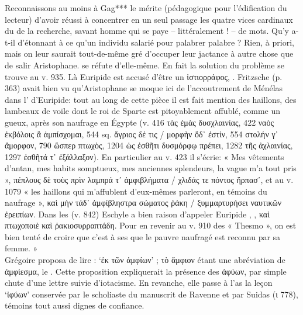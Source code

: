 {{Reconnaissons au moins à Gag*** le mérite (pédagogique pour l'édification du lecteur) d'avoir réussi à concentrer en un seul passage les quatre vices cardinaux du  de la recherche, savant homme qui se paye – littéralement ! – de mots. Qu'y a-t-il d'étonnant à ce qu'un individu salarié pour palabrer palabre ? Rien, à priori, mais on leur saurait tout-de-même gré d'occuper leur jactance à autre chose que de salir Aristophane.} se réfute d'elle-même. En fait la solution du problème se trouve au v. 935. Là Euripide est accusé d'être un ἱστιορράφος, . Fritzsche (p. 363) avait bien vu qu'Aristophane se moque ici de l'accoutrement de Ménélas dans l' d'Euripide: tout au long de cette pièce il est fait mention des haillons, des lambeaux de voile dont le roi de Sparte est pitoyablement affublé, comme un gueux, après son naufrage en Égypte (v. 416 τὰς ἐμὰς δυσχλαινίας, 422 ναὸς ἐκβόλοις ἃ ἀμπίσχομαι, 544 sq. ἄγριος δέ τις / μορφὴν ὅδ᾽ ἐστίν, 554 στολήν γ᾽ ἄμορφον, 790 ὥσπερ πτωχὸς, 1204 ὡς ἐσθῆτι δυσμόρφῳ πρέπει, 1282 τῆς ἀχλαινίας, 1297 ἐσθῆτά τ᾽ ἐξάλλαξον). En particulier au v. 423 il s'écrie: « Mes vêtements d'antan, mes habits somptueux, mes anciennes splendeurs, la vague m'a tout pris », πέπλους δὲ τοὺς πρὶν λαμπρά τ᾽ ἀμφιβλήματα / χλιδάς τε πόντος ἥρπασ᾽, et au v. 1079 « les haillons qui m'affublent d'eux-mêmes parleront, en témoins du naufrage », καὶ μὴν τάδ᾽ ἀμφίβληστρα σώματος ῥάκη / ξυμμαρτυρήσει ναυτικῶν ἐρειπίων. Dans les  (v. 842) Eschyle a bien raison d'appeler Euripide , , καὶ πτωχοποιὲ καὶ ῥακιοσυρραπτάδη. Pour en revenir au v. 910 des « Thesmo », on est bien tenté de croire que c'est à ses  que le pauvre naufragé est reconnu par sa femme. »\\ 
Grégoire proposa de lire : `ἐκ τῶν ἀμφίων' ; τὸ ἄμφιον étant une abréviation de ἀμφίεσμα, le . Cette proposition expliquerait la présence des ἀφύων, par simple chute d'une lettre suivie d'iotacisme. En revanche, elle passe à l'as la leçon `ἰφύων' conservée par le scholiaste du manuscrit de Ravenne et par Suidas (ι 778), témoins tout aussi dignes de confiance.
}
